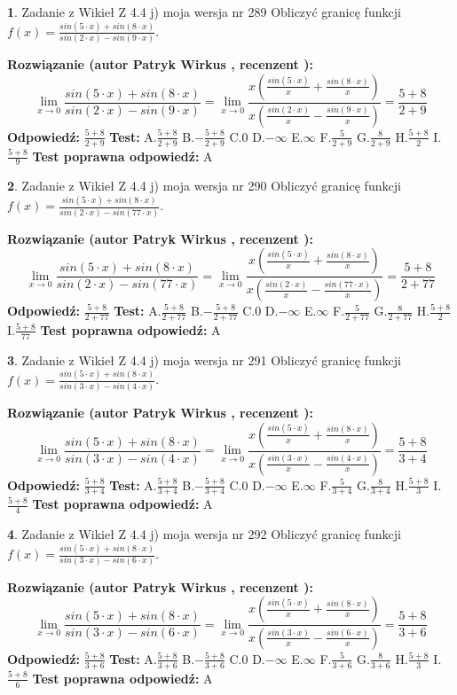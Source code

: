 \documentclass[12pt, a4paper]{article}
\theoremstyle{definition} %
\newtheorem{zad}{}
\newcommand{\zadStart}[1]{\begin{zad}#1\newline}
\newcommand{\zadStop}{\end{zad}}
\newcommand{\rozwStart}[2]{\noindent \textbf{Rozwiązanie (autor #1 , recenzent #2): }\newline}
\newcommand{\rozwStop}{\newline}
\newcommand{\odpStart}{\noindent \textbf{Odpowiedź:}\newline}
\newcommand{\odpStop}{\newline}
\newcommand{\testStart}{\noindent \textbf{Test:}\newline}
\newcommand{\testStop}{\newline}
\newcommand{\kluczStart}{\noindent \textbf{Test poprawna odpowiedź:}\newline}
\newcommand{\kluczStop}{\newline}
\begin{document}
\zadStart{Zadanie z Wikieł Z 4.4 j) moja wersja nr 289}
Obliczyć granicę funkcji $f(x)=\frac{sin(5\cdot x) +sin(8\cdot x)}{sin(2\cdot x) -sin(9\cdot x)}$.
\zadStop
\rozwStart{Patryk Wirkus}{}
$$\lim\limits_{x\to 0}\frac{sin(5\cdot x) +sin(8\cdot x)}{sin(2\cdot x) -sin(9\cdot x)}=\lim\limits_{x\to 0}\frac{x(\frac{sin(5\cdot x)}{x}+\frac{sin(8\cdot x)}{x})}{x(\frac{sin(2\cdot x)}{x}-\frac{sin(9\cdot x)}{x})}=\frac{5+8}{2+9}$$
\rozwStop
\odpStart
$\frac{5+8}{2+9}$
\odpStop
\testStart
A.$\frac{5+8}{2+9}$
B.$-\frac{5+8}{2+9}$
C.$0$
D.$-\infty$
E.$\infty$
F.$\frac{5}{2+9}$
G.$\frac{8}{2+9}$
H.$\frac{5+8}{2}$
I.$\frac{5+8}{9}$
\testStop
\kluczStart
A
\kluczStop



\zadStart{Zadanie z Wikieł Z 4.4 j) moja wersja nr 290}
Obliczyć granicę funkcji $f(x)=\frac{sin(5\cdot x) +sin(8\cdot x)}{sin(2\cdot x) -sin(77\cdot x)}$.
\zadStop
\rozwStart{Patryk Wirkus}{}
$$\lim\limits_{x\to 0}\frac{sin(5\cdot x) +sin(8\cdot x)}{sin(2\cdot x) -sin(77\cdot x)}=\lim\limits_{x\to 0}\frac{x(\frac{sin(5\cdot x)}{x}+\frac{sin(8\cdot x)}{x})}{x(\frac{sin(2\cdot x)}{x}-\frac{sin(77\cdot x)}{x})}=\frac{5+8}{2+77}$$
\rozwStop
\odpStart
$\frac{5+8}{2+77}$
\odpStop
\testStart
A.$\frac{5+8}{2+77}$
B.$-\frac{5+8}{2+77}$
C.$0$
D.$-\infty$
E.$\infty$
F.$\frac{5}{2+77}$
G.$\frac{8}{2+77}$
H.$\frac{5+8}{2}$
I.$\frac{5+8}{77}$
\testStop
\kluczStart
A
\kluczStop



\zadStart{Zadanie z Wikieł Z 4.4 j) moja wersja nr 291}
Obliczyć granicę funkcji $f(x)=\frac{sin(5\cdot x) +sin(8\cdot x)}{sin(3\cdot x) -sin(4\cdot x)}$.
\zadStop
\rozwStart{Patryk Wirkus}{}
$$\lim\limits_{x\to 0}\frac{sin(5\cdot x) +sin(8\cdot x)}{sin(3\cdot x) -sin(4\cdot x)}=\lim\limits_{x\to 0}\frac{x(\frac{sin(5\cdot x)}{x}+\frac{sin(8\cdot x)}{x})}{x(\frac{sin(3\cdot x)}{x}-\frac{sin(4\cdot x)}{x})}=\frac{5+8}{3+4}$$
\rozwStop
\odpStart
$\frac{5+8}{3+4}$
\odpStop
\testStart
A.$\frac{5+8}{3+4}$
B.$-\frac{5+8}{3+4}$
C.$0$
D.$-\infty$
E.$\infty$
F.$\frac{5}{3+4}$
G.$\frac{8}{3+4}$
H.$\frac{5+8}{3}$
I.$\frac{5+8}{4}$
\testStop
\kluczStart
A
\kluczStop



\zadStart{Zadanie z Wikieł Z 4.4 j) moja wersja nr 292}
Obliczyć granicę funkcji $f(x)=\frac{sin(5\cdot x) +sin(8\cdot x)}{sin(3\cdot x) -sin(6\cdot x)}$.
\zadStop
\rozwStart{Patryk Wirkus}{}
$$\lim\limits_{x\to 0}\frac{sin(5\cdot x) +sin(8\cdot x)}{sin(3\cdot x) -sin(6\cdot x)}=\lim\limits_{x\to 0}\frac{x(\frac{sin(5\cdot x)}{x}+\frac{sin(8\cdot x)}{x})}{x(\frac{sin(3\cdot x)}{x}-\frac{sin(6\cdot x)}{x})}=\frac{5+8}{3+6}$$
\rozwStop
\odpStart
$\frac{5+8}{3+6}$
\odpStop
\testStart
A.$\frac{5+8}{3+6}$
B.$-\frac{5+8}{3+6}$
C.$0$
D.$-\infty$
E.$\infty$
F.$\frac{5}{3+6}$
G.$\frac{8}{3+6}$
H.$\frac{5+8}{3}$
I.$\frac{5+8}{6}$
\testStop
\kluczStart
A
\kluczStop
\end{document}

